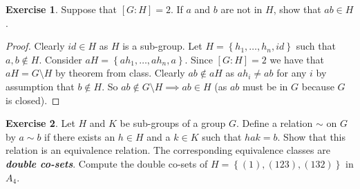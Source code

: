 \documentclass{article}
\theoremstyle{definition}
\newtheorem{theorem}{Exercise}[section]
\begin{document}
	\setcounter{theorem}{16}
	\begin{theorem}
		Suppose that $\left[G:H\right]=2$. If $a$ and $b$ are not in $H$, show that $ab\in H$.
	\end{theorem}
	\begin{proof}
		Clearly $id\in H$ as $H$ is a sub-group. Let $H=\left\{h_1,\ldots,h_n,id\right\}$ such that $a,b\not\in H$. Consider $aH=\left\{ah_1,\ldots,ah_n,a\right\}$. Since $\left[G:H\right]=2$ we have that $aH=G\setminus H$ by theorem from class. Clearly $ab\not\in aH$ as $ah_i\not=ab$ for any $i$ by assumption that $b\not\in H$. So $ab\not\in G\setminus H\implies ab\in H$ (as $ab$ must be in $G$ because $G$ is closed).
	\end{proof}

	\setcounter{theorem}{19}
	\begin{theorem}
		Let $H$ and $K$ be sub-groups of a group $G$. Define a relation $\sim$ on $G$ by $a\sim b$ if there exists an $h\in H$ and a $k\in K$ such that $hak=b$. Show that this relation is an equivalence relation. The corresponding equivalence classes are \textit{\textbf{double co-sets}}. Compute the double co-sets of $H=\left\{(1),(123),(132)\right\}$ in $A_4$.
	\end{theorem}
\end{document}
